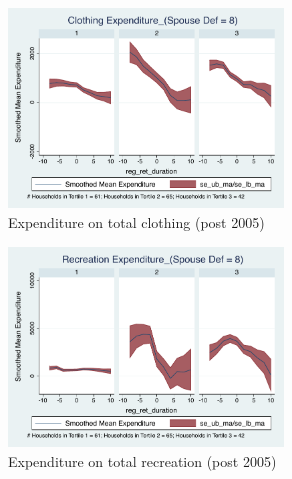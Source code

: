 \documentclass[11pt,onecolumn]{article}
\numberwithin{figure}{section}
\begin{document}
\clearpage

\begin{figure}[h]
	\caption{Expenditure on total clothing (post 2005)}
	\centering
	\includegraphics[width=0.65\textwidth]{../ConsumptionPostRetirement_by_SpouseDef_Cats/Smoothed/8/spouse_def_total_clothing_2005_real.pdf}
\end{figure}

\begin{figure}[h]
	\caption{Expenditure on total recreation (post 2005)}
	\centering
	\includegraphics[width=0.65\textwidth]{../ConsumptionPostRetirement_by_SpouseDef_Cats/Smoothed/8/spouse_def_total_recreation_2005_real.pdf}
\end{figure}

\clearpage
\end{document}
